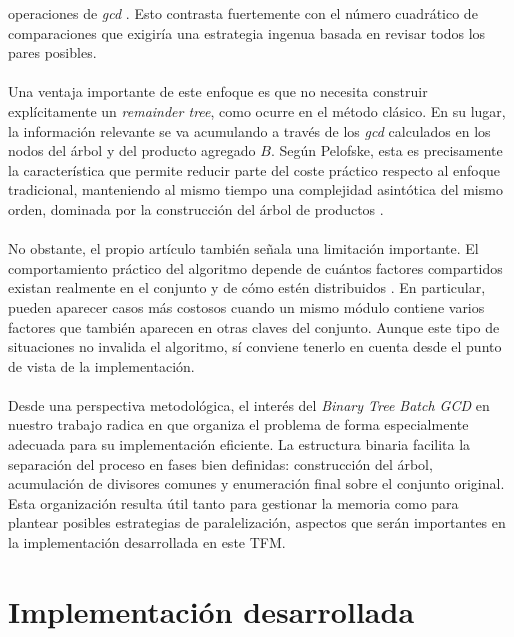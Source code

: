 operaciones de \textit{gcd} \cite{pelofske2024efficient}. Esto contrasta fuertemente con el número cuadrático de comparaciones que exigiría una estrategia ingenua basada en revisar todos los pares posibles.
\\
\\
Una ventaja importante de este enfoque es que no necesita construir explícitamente un \textit{remainder tree}, como ocurre en el método clásico. En su lugar, la información relevante se va acumulando a través de los \textit{gcd} calculados en los nodos del árbol y del producto agregado \(B\). Según Pelofske, esta es precisamente la característica que permite reducir parte del coste práctico respecto al enfoque tradicional, manteniendo al mismo tiempo una complejidad asintótica del mismo orden, dominada por la construcción del árbol de productos \cite{pelofske2024efficient}.
\\
\\
No obstante, el propio artículo también señala una limitación importante. El comportamiento práctico del algoritmo depende de cuántos factores compartidos existan realmente en el conjunto y de cómo estén distribuidos \cite{pelofske2024efficient}. En particular, pueden aparecer casos más costosos cuando un mismo módulo contiene varios factores que también aparecen en otras claves del conjunto. Aunque este tipo de situaciones no invalida el algoritmo, sí conviene tenerlo en cuenta desde el punto de vista de la implementación.
\\
\\
Desde una perspectiva metodológica, el interés del \textit{Binary Tree Batch GCD} en nuestro trabajo radica en que organiza el problema de forma especialmente adecuada para su implementación eficiente. La estructura binaria facilita la separación del proceso en fases bien definidas: construcción del árbol, acumulación de divisores comunes y enumeración final sobre el conjunto original. Esta organización resulta útil tanto para gestionar la memoria como para plantear posibles estrategias de paralelización, aspectos que serán importantes en la implementación desarrollada en este TFM.

\section{Implementación desarrollada}

